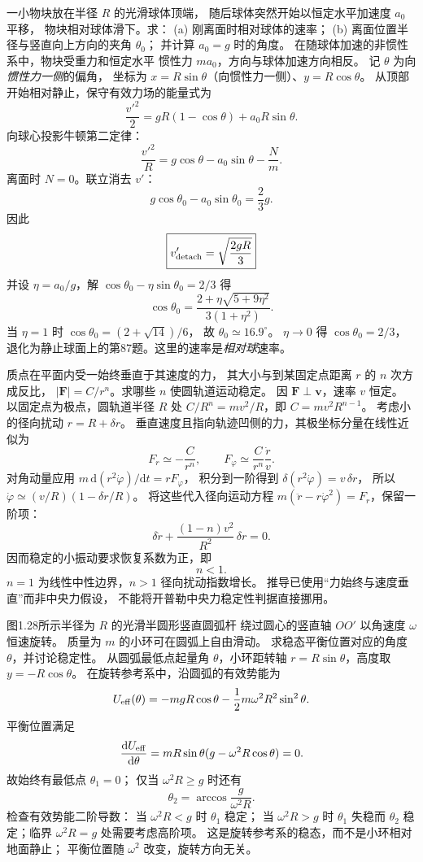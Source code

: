 一小物块放在半径 $R$ 的光滑球体顶端，
随后球体突然开始以恒定水平加速度 $a_0$ 平移，
物块相对球体滑下。求：
(a) 刚离面时相对球体的速率；
(b) 离面位置半径与竖直向上方向的夹角 $\theta_0$；
并计算 $a_0=g$ 时的角度。
\exsolution
在随球体加速的非惯性系中，物块受重力和恒定水平
惯性力 $m a_0$，方向与球体加速方向相反。
记 $\theta$ 为向\emph{惯性力一侧}的偏角，
坐标为 $x=R\sin\theta$（向惯性力一侧）、$y=R\cos\theta$。
从顶部开始相对静止，保守有效力场的能量式为
\[
\frac{v'^2}{2}=gR(1-\cos\theta)+a_0R\sin\theta.
\]
向球心投影牛顿第二定律：
\[
\frac{v'^2}{R}=g\cos\theta-a_0\sin\theta-\frac Nm.
\]
离面时 $N=0$。联立消去 $v'$：
\[
g\cos\theta_0-a_0\sin\theta_0=\frac23g.
\]
因此
\[
\boxed{v'_{\rm detach}=\sqrt{\frac{2gR}{3}}}
\]
并设 $\eta=a_0/g$，解
$\cos\theta_0-\eta\sin\theta_0=2/3$ 得
\[
\boxed{\cos\theta_0=
\frac{2+\eta\sqrt{5+9\eta^2}}{3(1+\eta^2)}}.
\]
当 $\eta=1$ 时
$\cos\theta_0=(2+\sqrt{14})/6$，
故 $\boxed{\theta_0\simeq16.9^\circ}$。
\excheck $\eta\to0$ 得 $\cos\theta_0=2/3$，
退化为静止球面上的第87题。这里的速率是\emph{相对球}速率。

质点在平面内受一始终垂直于其速度的力，
其大小与到某固定点距离 $r$ 的 $n$ 次方成反比，
$|\bm F|=C/r^n$。求哪些 $n$ 使圆轨道运动稳定。
\exsolution
因 $\bm F\perp\bm v$，速率 $v$ 恒定。
以固定点为极点，圆轨道半径 $R$ 处
$C/R^n=mv^2/R$，即 $C=mv^2R^{n-1}$。
考虑小的径向扰动 $r=R+\delta r$。
垂直速度且指向轨迹凹侧的力，其极坐标分量在线性近似为
\[
F_r\simeq-\frac{C}{r^n},\qquad
F_\varphi\simeq\frac{C}{r^n}\frac{\dot r}{v}.
\]
对角动量应用
$m\,\mathrm d(r^2\dot\varphi)/\mathrm dt=rF_\varphi$，
积分到一阶得到
$\delta(r^2\dot\varphi)=v\,\delta r$，
所以 $\dot\varphi\simeq(v/R)(1-\delta r/R)$。
将这些代入径向运动方程
$m(\ddot r-r\dot\varphi^2)=F_r$，保留一阶项：
\[
\delta\ddot r+\frac{(1-n)v^2}{R^2}\,\delta r=0.
\]
因而稳定的小振动要求恢复系数为正，即
\[
\boxed{n<1}.
\]
\excheck $n=1$ 为线性中性边界，$n>1$ 径向扰动指数增长。
推导已使用“力始终与速度垂直”而非中央力假设，
不能将开普勒中央力稳定性判据直接挪用。

图1.28所示半径为 $R$ 的光滑半圆形竖直圆弧杆
绕过圆心的竖直轴 $OO'$ 以角速度 $\omega$ 恒速旋转。
质量为 $m$ 的小环可在圆弧上自由滑动。
求稳态平衡位置对应的角度 $\theta$，并讨论稳定性。
\exsolution
从圆弧最低点起量角 $\theta$，小环距转轴
$r=R\sin\theta$，高度取 $y=-R\cos\theta$。
在旋转参考系中，沿圆弧的有效势能为
\[
U_{\rm eff}(\theta)=
-mgR\cos\theta-\frac12m\omega^2R^2\sin^2\theta.
\]
平衡位置满足
\[
\frac{\mathrm dU_{\rm eff}}{\mathrm d\theta}
=mR\sin\theta(g-\omega^2R\cos\theta)=0.
\]
故始终有最低点
$\boxed{\theta_1=0}$；
仅当 $\omega^2R\ge g$ 时还有
\[
\boxed{\theta_2=\arccos\frac{g}{\omega^2R}}.
\]
检查有效势能二阶导数：
当 $\omega^2R<g$ 时 $\theta_1$ 稳定；
当 $\omega^2R>g$ 时 $\theta_1$ 失稳而
$\theta_2$ 稳定；临界 $\omega^2R=g$ 处需要考虑高阶项。
\excheck 这是旋转参考系的稳态，而不是小环相对地面静止；
平衡位置随 $\omega^2$ 改变，旋转方向无关。

